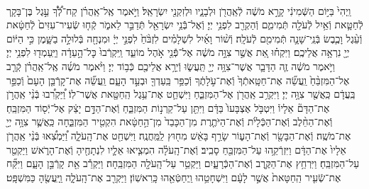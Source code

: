 \documentclass[twoside, openany, parskip=half, 11pt]{book}
\begin{document}
\begin{footnotesize}
\begin{multicols}{2}
\\
וַֽיְהִי֙ בַּיּ֣וֹם הַשְּֿׁמִינִ֔י קָרָ֣א מֹשֶׁ֔ה לְֿאַֽהֲרֹ֖ן וּלְבָנָ֑יו וּלְזִקְנֵ֖י יִשְׂרָאֵֽל׃ וַיֹּ֣אמֶר אֶֽל־אַֽהֲרֹ֗ן קַח־לְֿ֠ךָ֠ עֵ֣גֶל בֶּן־בָּקָ֧ר לְֿחַטָּ֛את וְֿאַ֥יִל לְֿעֹלָ֖ה תְּֿמִימִ֑ם וְֿהַקְרֵ֖ב לִפְנֵ֥י יְיָ׃ וְֿאֶל־בְּֿֿנֵ֥י יִשְׂרָאֵ֖ל תְּֿדַבֵּ֣ר לֵאמֹ֑ר קְֿח֤וּ שְֿׂעִיר־עִזִּים֙ לְֿחַטָּ֔את וְֿעֵ֨גֶל וָכֶ֧בֶשׂ בְּֿנֵֽי־שָׁנָ֛ה תְּֿמִימִ֖ם לְֿעֹלָֽה׃ וְֿשׁ֨וֹר וָאַ֜יִל לִשְׁלָמִ֗ים לִזְבֹּ֨חַ֙ לִפְנֵ֣י יְיָ֔ וּמִנְחָ֖ה בְּֿלוּלָ֣ה בַשָּׁ֑מֶן כִּ֣י הַיּ֔וֹם יְיָ֖ נִרְאָ֥ה אֲלֵיכֶֽם׃ וַיִּקְח֗וּ אֵ֚ת אֲשֶׁ֣ר צִוָּ֣ה מֹשֶׁ֔ה אֶל־פְּֿֿנֵ֖י אֹ֣הֶל מוֹעֵ֑ד וַֽיִּקְרְֿבוּ֙ כׇּל־הָ֣עֵדָ֔ה וַיַּֽעַמְד֖וּ לִפְנֵ֥י יְיָ׃ וַיֹּ֣אמֶר מֹשֶׁ֔ה זֶ֧ה הַדָּבָ֛ר אֲשֶׁר־צִוָּ֥ה יְיָ֖ תַּֽעֲשׂ֑וּ וְֿיֵרָ֥א אֲלֵיכֶ֖ם כְּֿב֥וֹד יְיָ׃  וַיֹּ֨אמֶר מֹשֶׁ֜ה אֶֽל־אַֽהֲרֹ֗ן קְֿרַ֤ב אֶל־הַמִּזְבֵּ֨חַ֙ וַֽעֲשֵׂ֞ה אֶת־חַטָּֽאתְֿךָ֙ וְֿאֶת־עֹ֣לָתֶ֔ךָ וְֿכַפֵּ֥ר בַּֽעַדְךָ֖ וּבְעַ֣ד הָעָ֑ם וַֽעֲשֵׂ֞ה אֶת־קָרְֿבַּ֤ן הָעָם֙ וְֿכַפֵּ֣ר בַּֽעֲדָ֔ם כַּֽאֲשֶׁ֖ר צִוָּ֥ה יְיָ׃ וַיִּקְרַ֥ב אַֽהֲרֹ֖ן אֶל־הַמִּזְבֵּ֑חַ וַיִּשְׁחַ֛ט אֶת־עֵ֥גֶל הַֽחַטָּ֖את אֲשֶׁר־לֽוֹ׃ וַ֠יַּקְרִ֠בוּ בְּֿנֵ֨י אַֽהֲרֹ֣ן אֶת־הַדָּם֘ אֵלָיו֒ וַיִּטְבֹּ֤ל אֶצְבָּעוֹ֙ בַּדָּ֔ם וַיִּתֵּ֖ן עַל־קַרְנ֣וֹת הַמִּזְבֵּ֑חַ וְֿאֶת־הַדָּ֣ם יָצַ֔ק אֶל־יְֿס֖וֹד הַמִּזְבֵּֽחַ׃ וְֿאֶת־הַחֵ֨לֶב וְֿאֶת־הַכְּֿלָיֹ֜ת וְֿאֶת־הַיֹּתֶ֤רֶת מִן־הַכָּבֵד֙ מִן־הַ֣חַטָּ֔את הִקְטִ֖יר הַמִּזְבֵּ֑חָה כַּֽאֲשֶׁ֛ר צִוָּ֥ה יְיָ֖ אֶת־מֹשֶֽׁה׃  וְֿאֶת־הַבָּשָׂ֖ר וְֿאֶת־הָע֑וֹר שָׂרַ֣ף בָּאֵ֔שׁ מִח֖וּץ לַֽמַּֽחֲנֶֽה׃ וַיִּשְׁחַ֖ט אֶת־הָֽעֹלָ֑ה וַ֠יַּמְצִ֠אוּ בְּֿנֵ֨י אַֽהֲרֹ֤ן אֵלָיו֙ אֶת־הַדָּ֔ם וַיִּזְרְֿקֵ֥הוּ עַל־הַמִּזְבֵּ֖חַ סָבִֽיב׃ וְֿאֶת־הָֽעֹלָ֗ה הִמְצִ֧יאוּ אֵלָ֛יו לִנְתָחֶ֖יהָ וְֿאֶת־הָרֹ֑אשׁ וַיַּקְטֵ֖ר עַל־הַמִּזְבֵּֽחַ׃ וַיִּרְחַ֥ץ אֶת־הַקֶּ֖רֶב וְֿאֶת־הַכְּֿרָעָ֑יִם וַיַּקְטֵ֥ר עַל־הָֽעֹלָ֖ה הַמִּזְבֵּֽחָה׃ וַיַּקְרֵ֕ב אֵ֖ת קָרְֿבַּ֣ן הָעָ֑ם וַיִּקַּ֞ח אֶת־שְֿׂעִ֤יר הַֽחַטָּאת֙ אֲשֶׁ֣ר לָעָ֔ם וַיִּשְׁחָטֵ֥הוּ וַֽיְחַטְּֿאֵ֖הוּ כָּֽרִאשֽׁוֹן׃ וַיַּקְרֵ֖ב אֶת־הָֽעֹלָ֑ה וַֽיַּֽעֲשֶׂ֖הָ כַּמִּשְׁפָּֽט׃


\end{multicols}
\end{footnotesize}
\end{document}
